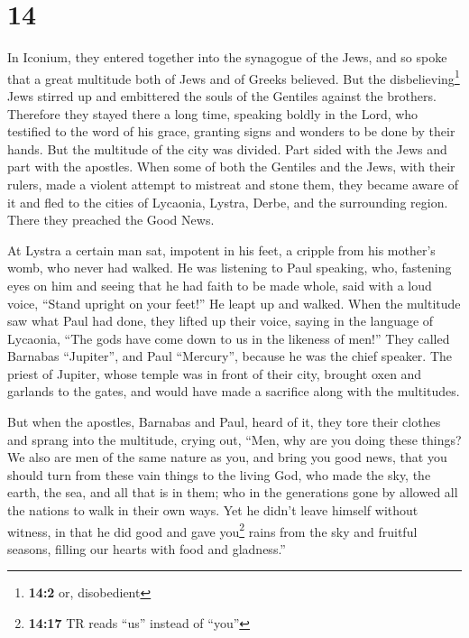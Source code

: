 \hypertarget{section-13}{%
\section{14}\label{section-13}}

 In Iconium, they entered together into the synagogue of
the Jews, and so spoke that a great multitude both of Jews and of Greeks
believed.  But the disbelieving\footnote{\textbf{14:2} or,
  disobedient} Jews stirred up and embittered the souls of the Gentiles
against the brothers.  Therefore they stayed there a long
time, speaking boldly in the Lord, who testified to the word of his
grace, granting signs and wonders to be done by their hands.
 But the multitude of the city was divided. Part sided
with the Jews and part with the apostles.  When some of
both the Gentiles and the Jews, with their rulers, made a violent
attempt to mistreat and stone them,  they became aware of
it and fled to the cities of Lycaonia, Lystra, Derbe, and the
surrounding region.  There they preached the Good News.

 At Lystra a certain man sat, impotent in his feet, a
cripple from his mother's womb, who never had walked.  He
was listening to Paul speaking, who, fastening eyes on him and seeing
that he had faith to be made whole,  said with a loud
voice, ``Stand upright on your feet!'' He leapt up and walked.
 When the multitude saw what Paul had done, they lifted
up their voice, saying in the language of Lycaonia, ``The gods have come
down to us in the likeness of men!''  They called
Barnabas ``Jupiter'', and Paul ``Mercury'', because he was the chief
speaker.  The priest of Jupiter, whose temple was in
front of their city, brought oxen and garlands to the gates, and would
have made a sacrifice along with the multitudes.

 But when the apostles, Barnabas and Paul, heard of it,
they tore their clothes and sprang into the multitude, crying out,
 ``Men, why are you doing these things? We also are men
of the same nature as you, and bring you good news, that you should turn
from these vain things to the living God, who made the sky, the earth,
the sea, and all that is in them;  who in the generations
gone by allowed all the nations to walk in their own ways.
 Yet he didn't leave himself without witness, in that he
did good and gave you\footnote{\textbf{14:17} TR reads ``us'' instead of
  ``you''} rains from the sky and fruitful seasons, filling our hearts
with food and gladness.''

